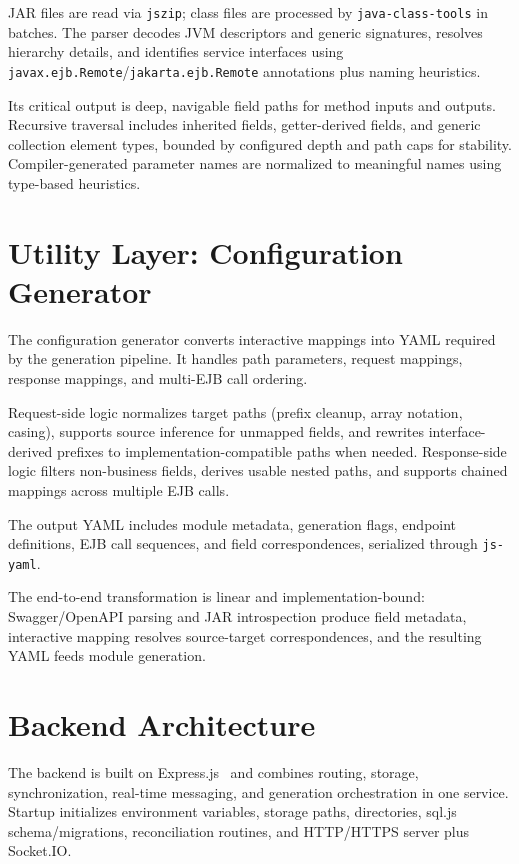 JAR files are read via \texttt{jszip}; class files are processed by \texttt{java-class-tools} in batches. The parser decodes JVM descriptors and generic signatures, resolves hierarchy details, and identifies service interfaces using \texttt{javax.ejb.Remote}/\texttt{jakarta.ejb.Remote} annotations plus naming heuristics.

Its critical output is deep, navigable field paths for method inputs and outputs. Recursive traversal includes inherited fields, getter-derived fields, and generic collection element types, bounded by configured depth and path caps for stability. Compiler-generated parameter names are normalized to meaningful names using type-based heuristics.

\section{Utility Layer: Configuration Generator}

The configuration generator converts interactive mappings into YAML required by the generation pipeline. It handles path parameters, request mappings, response mappings, and multi-EJB call ordering.

Request-side logic normalizes target paths (prefix cleanup, array notation, casing), supports source inference for unmapped fields, and rewrites interface-derived prefixes to implementation-compatible paths when needed. Response-side logic filters non-business fields, derives usable nested paths, and supports chained mappings across multiple EJB calls.

The output YAML includes module metadata, generation flags, endpoint definitions, EJB call sequences, and field correspondences, serialized through \texttt{js-yaml}.

The end-to-end transformation is linear and implementation-bound: Swagger/OpenAPI parsing and JAR introspection produce field metadata, interactive mapping resolves source-target correspondences, and the resulting YAML feeds module generation.

\section{Backend Architecture}

The backend is built on Express.js~\cite{express_docs} and combines routing, storage, synchronization, real-time messaging, and generation orchestration in one service. Startup initializes environment variables, storage paths, directories, sql.js schema/migrations, reconciliation routines, and HTTP/HTTPS server plus Socket.IO.

